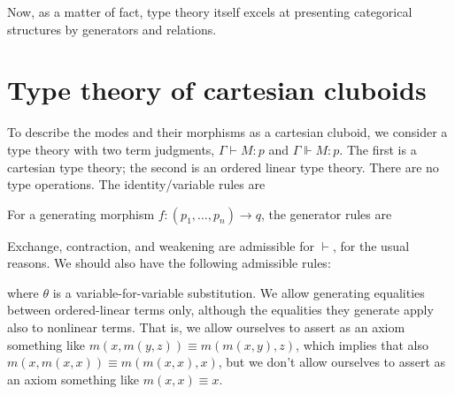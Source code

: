 \documentclass{amsart}
\theoremstyle{definition}
\let\types\vdash
\let\ttypes\Vdash
\begin{document}
Now, as a matter of fact, type theory itself excels at presenting categorical structures by generators and relations.


\section{Type theory of cartesian cluboids}
\label{sec:tt-cluboid}

To describe the modes and their morphisms as a cartesian cluboid, we consider a type theory with two term judgments, $\Gamma\types M:p$ and $\Gamma\ttypes M:p$.
The first is a cartesian type theory; the second is an ordered linear type theory.
There are no type operations.
The identity/variable rules are
For a generating morphism $f:(p_1,\dots,p_n) \to q$, the generator rules are
Exchange, contraction, and weakening are admissible for $\types$, for the usual reasons.
We should also have the following admissible rules:
where $\theta$ is a variable-for-variable substitution.
We allow generating equalities between ordered-linear terms only, although the equalities they generate apply also to nonlinear terms.
That is, we allow ourselves to assert as an axiom something like $m(x,m(y,z)) \equiv m(m(x,y),z)$, which implies that also $m(x,m(x,x)) \equiv m(m(x,x),x)$, but we don't allow ourselves to assert as an axiom something like $m(x,x) \equiv x$.
\end{document}

